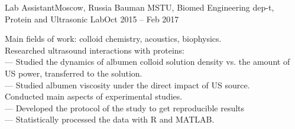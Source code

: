 \resumeSubheading
    {Lab Assistant}{Moscow, Russia}
    {Bauman MSTU, Biomed Engineering dep-t, Protein and Ultrasonic Lab}{Oct 2015 -- Feb 2017}
    \begin{itemize}[leftmargin=0in, label={}]
        \small{\item{
            {Main fields of work: colloid chemistry, acoustics, biophysics.}\\
            {Researched ultrasound interactions with proteins:}\\
            {— Studied the dynamics of albumen colloid solution density vs. the amount of US power, transferred to the solution.}\\
            {— Studied albumen viscosity under the direct  impact of US source.}\\
            {Conducted main aspects of experimental studies.}\\
            {— Developed the protocol of the study to get reproducible results}\\
            {— Statistically processed the data with R and MATLAB.}\\
        }}
    \end{itemize}